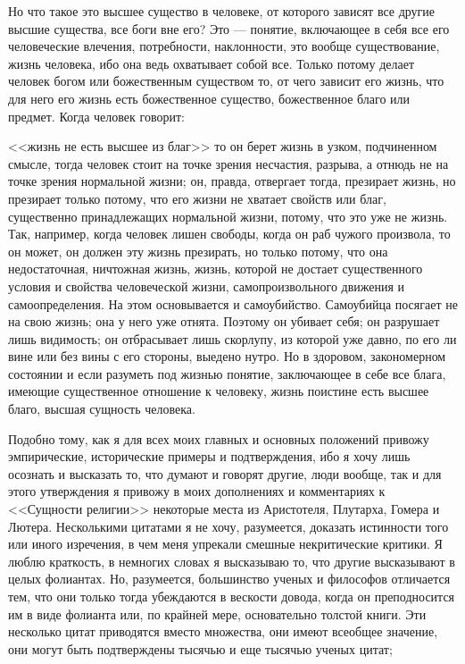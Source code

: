 \documentclass[12pt]{article}
\begin{document}
Но что такое это высшее существо в человеке, от которого зависят все другие высшие существа, все боги вне его? Это --- понятие, включающее в себя все его человеческие влечения, потребности, наклонности, это вообще существование, жизнь человека, ибо она ведь охватывает собой все. Только потому делает человек богом или божественным существом то, от чего зависит его жизнь, что для него его жизнь есть божественное существо, божественное благо или предмет. Когда человек говорит: 

<<жизнь не есть высшее из благ>>  то он берет жизнь в узком, подчиненном смысле, тогда человек стоит на точке зрения несчастия, разрыва, а отнюдь не на точке зрения нормальной жизни; он, правда, отвергает тогда, презирает жизнь, но презирает только потому, что его жизни не хватает свойств или благ, существенно принадлежащих нормальной жизни, потому, что это уже не жизнь. Так, например, когда человек лишен свободы, когда он раб чужого произвола, то он может, он должен эту жизнь презирать, но только потому, что она недостаточная, ничтожная жизнь, жизнь, которой не достает существенного условия и свойства человеческой жизни, самопроизвольного движения и самоопределения. На этом основывается и самоубийство. Самоубийца посягает не на свою жизнь; она у него уже отнята. Поэтому он убивает себя; он разрушает лишь видимость; он отбрасывает лишь скорлупу, из которой уже давно, по его ли вине или без вины с его стороны, выедено нутро. Но в здоровом, закономерном состоянии и если разуметь под жизнью понятие, заключающее в себе все блага, имеющие существенное отношение к человеку, жизнь поистине есть высшее благо, высшая сущность человека. 

Подобно тому, как я для всех моих главных и основных положений привожу эмпирические, исторические примеры и подтверждения, ибо я хочу лишь осознать и высказать то, что думают и говорят другие, люди вообще, так и для этого утверждения я привожу в моих дополнениях и комментариях к <<Сущности религии>> некоторые места из Аристотеля, Плутарха, Гомера и Лютера. Несколькими цитатами я не хочу, разумеется, доказать истинности того или иного изречения, в чем меня упрекали смешные некритические критики. Я люблю краткость, в немногих словах я высказываю то, что другие высказывают в целых фолиантах. Но, разумеется, большинство ученых и философов отличается тем, что они только тогда убеждаются в вескости довода, когда он преподносится им в виде фолианта или, по крайней мере, основательно толстой книги. Эти несколько цитат приводятся вместо множества, они имеют всеобщее значение, они могут быть подтверждены тысячью и еще тысячью ученых цитат; 
\end{document}
